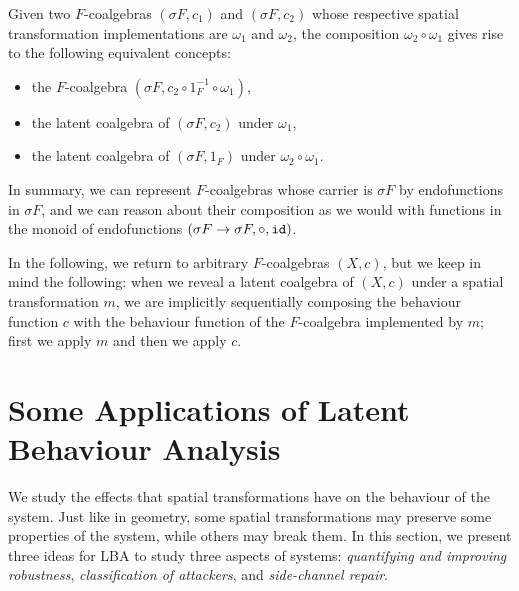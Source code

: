 Given two $F$-coalgebras $(\sigma F, c_1)$ and $(\sigma F, c_2)$ whose respective spatial transformation implementations are $\omega_1$ and $\omega_2$, the composition $\omega_2\circ \omega_1$ gives rise to the following equivalent concepts:
\begin{itemize}
    \item the $F$-coalgebra $(\sigma F, c_2\circ 1_F^{-1}\circ\omega_1)$,
    \item the latent coalgebra of $(\sigma F, c_2)$ under $\omega_1$,
    \item the latent coalgebra of $(\sigma F, 1_F)$ under $\omega_2\circ \omega_1$.
\end{itemize}
In summary, we can represent $F$-coalgebras whose carrier is $\sigma F$ by endofunctions in $\sigma F$, and we can reason about their composition as we would with functions in the monoid of endofunctions $(\sigma F\rightarrow \sigma F, \circ, {\texttt{id}})$. 

In the following, we return to arbitrary $F$-coalgebras $(X,c)$, but we keep in mind the following: when we reveal a latent coalgebra of $(X,c)$ under a spatial transformation $m$, we are implicitly sequentially composing the behaviour function $c$ with the behaviour function of the $F$-coalgebra implemented by $m$; first we apply $m$ and then we apply $c$.

\section{Some Applications of Latent Behaviour Analysis}
We study the effects that spatial transformations have on the behaviour of the system. Just like in geometry, some spatial transformations may preserve some properties of the system, while others may break them. In this section, we present three ideas for LBA to study three aspects of systems: \emph{quantifying and improving robustness}, \emph{classification of attackers}, and \emph{side-channel repair}.


